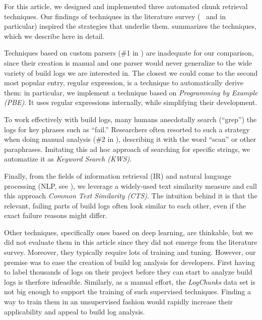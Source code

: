 For this article, we designed and implemented three automated chunk
retrieval techniques.
Our findings of techniques in the literature
survey (~ and  in
particular) inspired the strategies that underlie them.
 summarizes the techniques, which we describe here
in detail.

Techniques based on custom parsers (\#1
in ) are inadequate for our comparison,
since their creation is manual and one parser would never generalize
to the wide variety of build logs we are interested in.
The closest
we could come to the second most popular entry, regular expression, is
a technique to automatically derive them: in particular, we implement
a technique based on
\emph{Programming by Example (PBE)}.
It uses regular expressions internally, while simplifying their
development.

To work effectively with build logs, many humans anecdotally search
(``grep'') the logs for key phrases such as ``fail.'' Researchers often
resorted to such a strategy when doing manual analysis (\#2
in ), describing it with the word ``scan''
or other paraphrases.
Imitating this ad hoc approach of searching for
specific strings, we automatize it as \emph{Keyword Search (KWS)}.

Finally, from the fields of information retrieval (IR) and natural
language
processing (NLP, see ), we leverage
a widely-used text similarity measure and call this approach \emph{Common
Text Similarity (CTS)}.
The intuition behind it is that the relevant,
failing parts of build logs often look similar to each other, even if
the exact failure reasons might differ.

Other techniques, specifically ones based on deep learning, are
thinkable, but we did not evaluate them in this article since they did
not emerge from the literature survey.
Moreover, they typically
require lots of training and tuning.
However, our premise was to ease
the creation of build log analysis for developers.
First having to
label thousands of logs on their project before they can start to
analyze build logs is therfore infeasible.
Similarly, as a manual
effort, the \emph{LogChunks} data set is not big enough to support the
training of such supervised techniques.
Finding a way to train them in
an unsupervised fashion would rapidly increase their applicability and
appeal to build log analysis.

